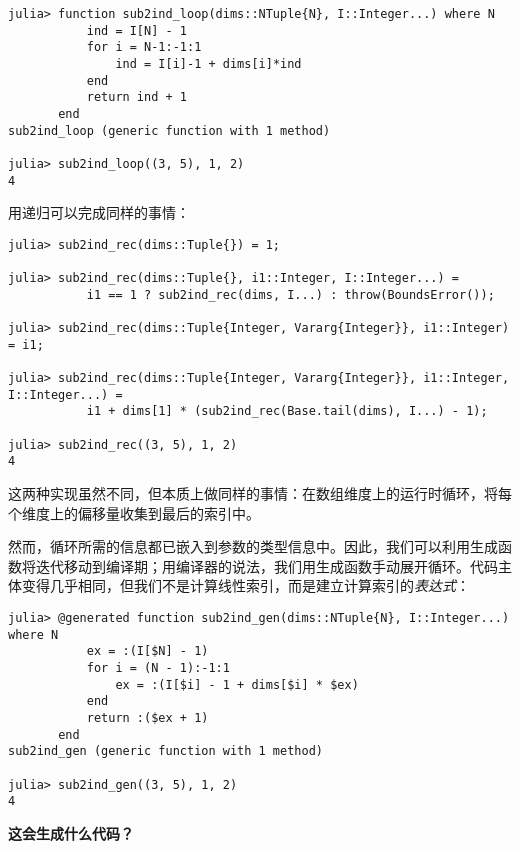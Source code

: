 \begin{verbatim}
julia> function sub2ind_loop(dims::NTuple{N}, I::Integer...) where N
           ind = I[N] - 1
           for i = N-1:-1:1
               ind = I[i]-1 + dims[i]*ind
           end
           return ind + 1
       end
sub2ind_loop (generic function with 1 method)

julia> sub2ind_loop((3, 5), 1, 2)
4
\end{verbatim}



用递归可以完成同样的事情：




\begin{verbatim}
julia> sub2ind_rec(dims::Tuple{}) = 1;

julia> sub2ind_rec(dims::Tuple{}, i1::Integer, I::Integer...) =
           i1 == 1 ? sub2ind_rec(dims, I...) : throw(BoundsError());

julia> sub2ind_rec(dims::Tuple{Integer, Vararg{Integer}}, i1::Integer) = i1;

julia> sub2ind_rec(dims::Tuple{Integer, Vararg{Integer}}, i1::Integer, I::Integer...) =
           i1 + dims[1] * (sub2ind_rec(Base.tail(dims), I...) - 1);

julia> sub2ind_rec((3, 5), 1, 2)
4
\end{verbatim}



这两种实现虽然不同，但本质上做同样的事情：在数组维度上的运行时循环，将每个维度上的偏移量收集到最后的索引中。



然而，循环所需的信息都已嵌入到参数的类型信息中。因此，我们可以利用生成函数将迭代移动到编译期；用编译器的说法，我们用生成函数手动展开循环。代码主体变得几乎相同，但我们不是计算线性索引，而是建立计算索引的\emph{表达式}：




\begin{verbatim}
julia> @generated function sub2ind_gen(dims::NTuple{N}, I::Integer...) where N
           ex = :(I[$N] - 1)
           for i = (N - 1):-1:1
               ex = :(I[$i] - 1 + dims[$i] * $ex)
           end
           return :($ex + 1)
       end
sub2ind_gen (generic function with 1 method)

julia> sub2ind_gen((3, 5), 1, 2)
4
\end{verbatim}



\textbf{这会生成什么代码？}



